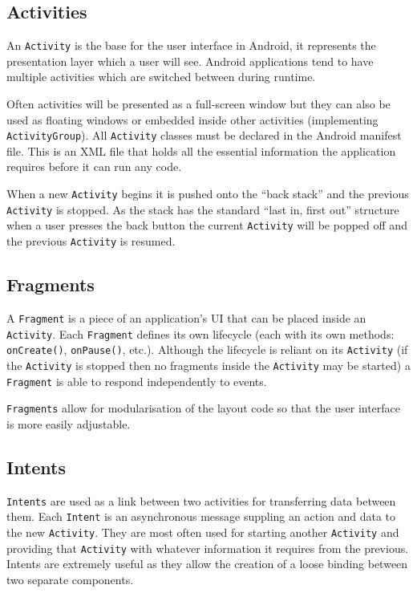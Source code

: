 \documentclass[draft]{report}
\begin{document}
\subsection{Activities}
\label{sub:activities}

An {\tt Activity} is the base for the user interface in Android, it represents the presentation layer which a user will see. Android applications tend to have multiple activities which are switched between during runtime.

Often activities will be presented as a full-screen window but they can also be used as floating windows or embedded inside other activities (implementing {\tt ActivityGroup}). All {\tt Activity} classes must be declared in the Android manifest file. This is an XML file that holds all the essential information the application requires before it can run any code.

When a new {\tt Activity} begins it is pushed onto the ``back stack'' and the previous {\tt Activity} is stopped. As the stack has the standard ``last in, first out'' structure when a user presses the back button the current {\tt Activity} will be popped off and the previous {\tt Activity} is resumed. 

\subsection{Fragments}
\label{sub:fragments}

A {\tt Fragment} is a piece of an application's UI that can be placed inside an {\tt Activity}. Each {\tt Fragment} defines its own lifecycle (each with its own methods: {\tt onCreate()}, {\tt onPause()}, etc.). Although the lifecycle is reliant on its {\tt Activity} (if the {\tt Activity} is stopped then no fragments inside the {\tt Activity} may be started) a {\tt Fragment} is able to respond independently to events.

{\tt Fragments} allow for modularisation of the layout code so that the user interface is more easily adjustable.

\subsection{Intents}
\label{sub:intents}

{\tt Intents} are used as a link between two activities for transferring data between them. Each {\tt Intent} is an asynchronous message suppling an action and data to the new {\tt Activity}. They are most often used for starting another {\tt Activity} and providing that {\tt Activity} with whatever information it requires from the previous. Intents are extremely useful as they allow the creation of a loose binding between two separate components.
\end{document}
